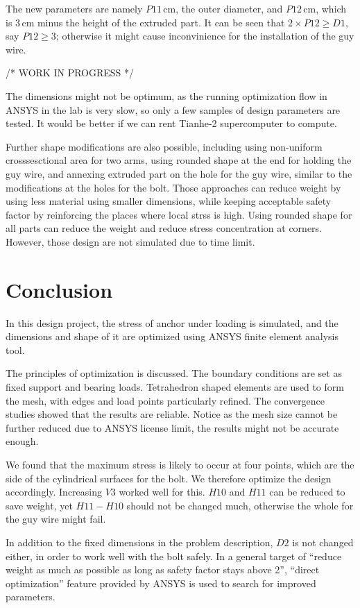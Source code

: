 \documentclass[a4paper,14pt]{extarticle}
\newcommand{\cm}{\,\si{\centi\meter}}
\begin{document}
The new parameters are namely $P11\cm$, the outer diameter, and $P12 \cm$, which is $3\cm$ minus the height of the extruded part. It can be seen that $2 \times P12 \geq D1$, say $P12 \geq 3$; otherwise it might cause inconvinience for the installation of the guy wire.

/* WORK IN PROGRESS */

The dimensions might not be optimum, as the running optimization flow in ANSYS in the lab is very slow, so only a few samples of design parameters are tested. It would be better if we can rent Tianhe-2 supercomputer to compute.

Further shape modifications are also possible, including using non-uniform crosssesctional area for two arms, using rounded shape at the end for holding the guy wire, and annexing extruded part on the hole for the guy wire, similar to the modifications at the holes for the bolt. Those approaches can reduce weight by using less material using smaller dimensions, while keeping acceptable safety factor by reinforcing the places where local strss is high. Using rounded shape for all parts can reduce the weight and reduce stress concentration at corners. However, those design are not simulated due to time limit. 
\section{Conclusion}
In this design project, the stress of anchor under loading is simulated, and the dimensions and shape of it are optimized using ANSYS finite element analysis tool.

The principles of optimization is discussed. The boundary conditions are set as fixed support and bearing loads. Tetrahedron shaped elements are used to form the mesh, with edges and load points particularly refined. The convergence studies showed that the results are reliable. Notice as the mesh size cannot be further reduced due to ANSYS license limit, the results might not be accurate enough.

We found that the maximum stress is likely to occur at four points, which are the side of the cylindrical surfaces for the bolt. We therefore optimize the design accordingly. Increasing $V3$ worked well for this. $H10$ and $H11$ can be reduced to save weight, yet $H11 - H10$ should not be changed much, otherwise the whole for the guy wire might fail.

In addition to the fixed dimensions in the problem description, $D2$ is not changed either, in order to work well with the bolt safely. In a general target of ``reduce weight as much as possible as long as safety factor stays above 2'', ``direct optimization'' feature provided by ANSYS is used to search for improved parameters.
\end{document}

